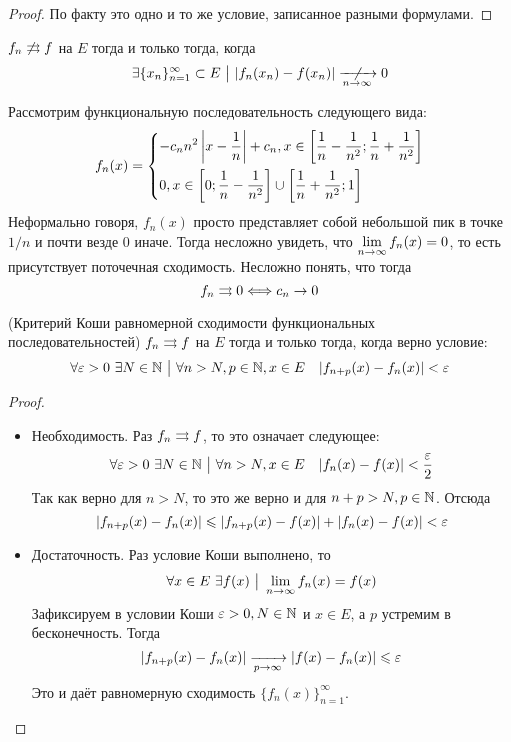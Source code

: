 \begin{proof}
	По факту это одно и то же условие, записанное разными формулами.
\end{proof}

\begin{corollary}
	$f_n \not\rightrightarrows f$ на $E$ тогда и только тогда, когда
	\[
		\exists \{x_n\}_{n = 1}^\infty \subset E \such |f_n(x_n) - f(x_n)| \centernot{\xrightarrow[n \to \infty]{}} 0
	\]
\end{corollary}

\begin{example}
	Рассмотрим функциональную последовательность следующего вида:
	\[
		f_n(x) = \left\{\begin{aligned}
			&{-c_n n^2 \left|x - \frac{1}{n}\right| + c_n, x \in \left[\frac{1}{n} - \frac{1}{n^2}; \frac{1}{n} + \frac{1}{n^2}\right]}
			\\
			&{0, x \in \left[0; \frac{1}{n} - \frac{1}{n^2}\right] \cup \left[\frac{1}{n} + \frac{1}{n^2}; 1\right]}
		\end{aligned}\right.
	\]
	Неформально говоря, $f_n(x)$ просто представляет собой небольшой пик в точке $1/n$ и почти везде 0 иначе. Тогда несложно увидеть, что $\lim\limits_{n \to \infty} f_n(x) = 0$, то есть присутствует поточечная сходимость. Несложно понять, что тогда
	\[
		f_n \rightrightarrows 0 \Longleftrightarrow c_n \to 0
	\]
\end{example}

\begin{theorem} (Критерий Коши равномерной сходимости функциональных последовательностей)
	$f_n \rightrightarrows f$ на $E$ тогда и только тогда, когда верно условие:
	\[
		\forall \varepsilon > 0\ \exists N \in \mathbb{N} \ \big|\  \forall n > N, p \in \mathbb{N}, x \in E \quad |f_{n + p}(x) - f_n(x)| < \varepsilon
	\]
\end{theorem}

\begin{proof}~
	\begin{itemize}
		\item Необходимость. Раз $f_n \rightrightarrows f$, то это означает следующее:
		\[
			\forall \varepsilon > 0\ \exists N \in \mathbb{N} \ \big|\  \forall n > N, x \in E \quad |f_n(x) - f(x)| < \frac{\varepsilon}{2}
		\]
		Так как верно для $n > N$, то это же верно и для $n + p > N, p \in \mathbb{N}$. Отсюда
		\[
			|f_{n + p}(x) - f_n(x)| \leqslant |f_{n + p}(x) - f(x)| + |f_n(x) - f(x)| < \varepsilon
		\]
		
		\item Достаточность. Раз условие Коши выполнено, то
		\[
			\forall x \in E\ \exists f(x) \ \big|\  \lim\limits_{n \to \infty} f_n(x) = f(x)
		\]
		Зафиксируем в условии Коши $\varepsilon > 0, N \in \mathbb{N}$ и $x \in E$, а $p$ устремим в бесконечность. Тогда
		\[
			|f_{n + p}(x) - f_n(x)| \xrightarrow[p \to \infty]{} |f(x) - f_n(x)| \leqslant \varepsilon
		\]
		Это и даёт равномерную сходимость $\{f_n(x)\}_{n = 1}^\infty$.
	\end{itemize}
\end{proof}

